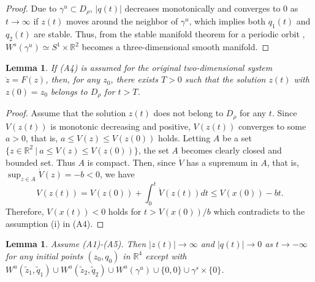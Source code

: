\documentclass[11pt,reqno]{amsart}
\newtheorem{lemma}[theorem]{Lemma}
\begin{document}
\begin{proof}
Due to $\gamma^u\subset D_\rho$, $|q(t)|$ decreases monotonically and converges to 0 as $t\to\infty$ if $z(t)$ moves around the neighbor of $\gamma^u$, which implies both $q_1(t)$ and $q_2(t)$ are stable. Thus, from the stable manifold theorem for a periodic orbit \cite{Teschl}, $W^s(\gamma^u)\simeq S^1\times\mathbb{R}^2$ becomes a three-dimensional smooth manifold.
\end{proof}


\begin{lemma}\label{lyap-prop}
If (A4) is assumed for the original two-dimensional system $\dot{z}=F(z)$, then, for any $z_0$, there exists $T>0$ such that the solution $z(t)$ with $z(0)=z_0$ belongs to $D_\rho$ for $t>T$.
\end{lemma}

\begin{proof}
Assume that the solution $z(t)$ does not belong to $D_\rho$ for any $t$. Since  $V(z(t))$ is monotonic decreasing and positive, $V(z(t))$ converges to some $a>0$, that is, $a\leq V(z)\leq V(z(0))$ holds. Letting $A$ be a set $\{z\in\mathbb{R}^2\ |\ a\leq V(z)\leq V(z(0))\}$, the set $A$ becomes clearly closed and bounded set. Thus $A$ is compact. Then, since $\dot{V}$ has a supremum in $A$, that is, $\displaystyle\sup_{z\in A}\dot{V}(z)=-b<0$, we have
$$
V(z(t))=V(z(0))+\int_0^t\dot{V}(z(t))dt\leq V(x(0))-bt.
$$
Therefore, $V(x(t))<0$ holds for $t>V(x(0))/b$ which contradicts to the assumption (i) in (A4).

\end{proof}


\begin{lemma}\label{conv}
Assume (A1)-(A5). Then $|z(t)|\to\infty$ and $|q(t)|\to 0$ as $t\to-\infty$ for any initial points $(z_0,q_0)$ in $\mathbb{R}^4$ except with $W^u(\tilde{z}_1,\tilde{q}_1)\cup W^u(\tilde{z}_2,\tilde{q}_2)\cup W^u(\gamma^u)\cup\{0,0\}\cup\gamma^s\times\{0\}$.
\end{lemma}
\end{document}
